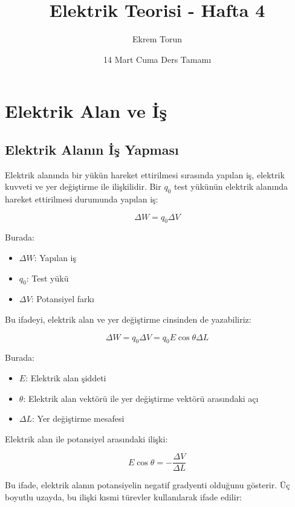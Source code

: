 \documentclass[12pt,a4paper]{fenbil}
\title{\textbf{Elektrik Teorisi - Hafta 4}}
\author{Ekrem Torun}
\date{14 Mart Cuma Ders Tamamı}
\begin{document}
\maketitle
\tableofcontents
\newpage

\section{Elektrik Alan ve İş}

\subsection{Elektrik Alanın İş Yapması}

Elektrik alanında bir yükün hareket ettirilmesi sırasında yapılan iş, elektrik kuvveti ve yer değiştirme ile ilişkilidir. Bir $q_0$ test yükünün elektrik alanında hareket ettirilmesi durumunda yapılan iş:

\begin{equation}
\Delta W = q_0 \Delta V
\end{equation}

Burada:
\begin{itemize}
    \item $\Delta W$: Yapılan iş
    \item $q_0$: Test yükü
    \item $\Delta V$: Potansiyel farkı
\end{itemize}

Bu ifadeyi, elektrik alan ve yer değiştirme cinsinden de yazabiliriz:

\begin{equation}
\Delta W = q_0 \Delta V = q_0 E \cos\theta \Delta L
\end{equation}

Burada:
\begin{itemize}
    \item $E$: Elektrik alan şiddeti
    \item $\theta$: Elektrik alan vektörü ile yer değiştirme vektörü arasındaki açı
    \item $\Delta L$: Yer değiştirme mesafesi
\end{itemize}

Elektrik alan ile potansiyel arasındaki ilişki:

\begin{equation}
E \cos\theta = -\frac{\Delta V}{\Delta L}
\end{equation}

Bu ifade, elektrik alanın potansiyelin negatif gradyenti olduğunu gösterir. Üç boyutlu uzayda, bu ilişki kısmi türevler kullanılarak ifade edilir:
\end{document}
